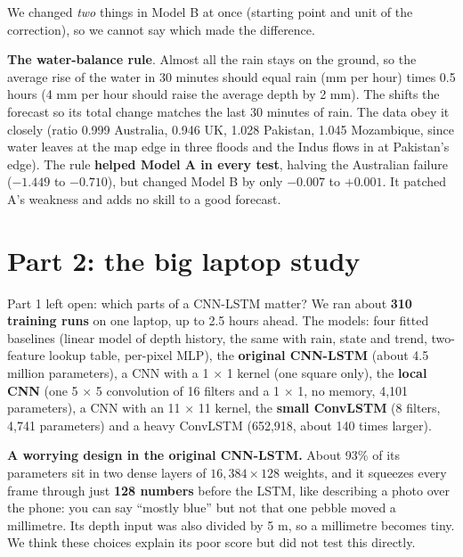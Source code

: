 \begin{carefulbox}
We changed \emph{two} things in Model B at once (starting point and unit of the correction), so we cannot say which made the difference.
\end{carefulbox}

\textbf{The water-balance rule}\label{sec:rule}. Almost all the rain stays on the ground, so the average rise of the water in 30 minutes should equal rain (mm per hour) times 0.5 hours (4 mm per hour should raise the average depth by 2 mm). The  shifts the forecast so its total change matches the last 30 minutes of rain. The data obey it closely (ratio 0.999 Australia, 0.946 UK, 1.028 Pakistan, 1.045 Mozambique, since water leaves at the map edge in three floods and the Indus flows in at Pakistan's edge). The rule \textbf{helped Model A in every test}, halving the Australian failure ($-1.449$ to $-0.710$), but changed Model B by only $-0.007$ to $+0.001$. It patched A's weakness and adds no skill to a good forecast.

\section{Part 2: the big laptop study}\label{ch:p2set}

Part 1 left open: which parts of a CNN-LSTM matter? We ran about \textbf{310 training runs} on one laptop, up to 2.5 hours ahead. The models: four fitted baselines (linear model of depth history, the same with rain, state and trend, two-feature lookup table, per-pixel MLP), the \textbf{original CNN-LSTM} (about 4.5 million parameters), a CNN with a 1 $\times$ 1 kernel (one square only), the \textbf{local CNN} (one 5 $\times$ 5 convolution of 16 filters and a 1 $\times$ 1, no memory, 4,101 parameters), a CNN with an 11 $\times$ 11 kernel, the \textbf{small ConvLSTM} (8 filters, 4,741 parameters) and a heavy ConvLSTM (652,918, about 140 times larger).

\textbf{A worrying design in the original CNN-LSTM.} About 93\% of its parameters sit in two dense layers of $16{,}384\times128$ weights, and it squeezes every frame through just \textbf{128 numbers} before the LSTM, like describing a photo over the phone: you can say ``mostly blue'' but not that one pebble moved a millimetre. Its depth input was also divided by 5 m, so a millimetre becomes tiny. We think these choices explain its poor score but did not test this directly.

